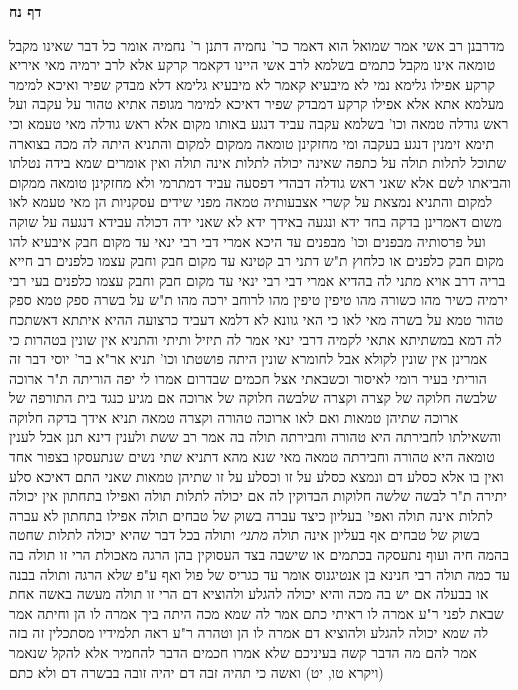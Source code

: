 \documentclass[12pt, openany]{book}
\newcommand{\sethebfont}{
\fontsize{10.5pt}{21.0pt} \selectfont
}
\newcommand{\twocol}[1]{
	{\sethebfont \begin{multicols}{2}
			#1
	\end{multicols}}	
}
\newcommand{\sectname}{}
\newcommand{\newsection}[1]{
	\addcontentsline{toc}{section}{#1}
	\renewcommand{\sectname}{#1}	
	\vspace{-\baselineskip}
	\begin{center}
		\textbf{%
\fontsize{16pt}{16pt}\selectfont
			#1}
	\end{center}
	\vspace{-\baselineskip}
	\nopagebreak
}
\begin{document}
\newsection{דף נח}
\twocol{מדרבנן 
רב אשי אמר שמואל הוא דאמר כר' נחמיה דתנן ר' נחמיה אומר כל דבר שאינו מקבל טומאה אינו מקבל כתמים 
בשלמא לרב אשי היינו דקאמר קרקע אלא לרב ירמיה מאי איריא קרקע אפילו גלימא נמי לא מיבעיא קאמר
לא מיבעיא גלימא דלא מבדק שפיר ואיכא למימר מעלמא אתא אלא אפילו קרקע דמבדק שפיר דאיכא למימר מגופה אתיא טהור
על עקבה ועל ראש גודלה טמאה וכו' בשלמא עקבה עביד דנגע באותו מקום אלא ראש גודלה מאי טעמא וכי תימא זימנין דנגע בעקבה ומי מחזקינן טומאה ממקום למקום 
והתניא היתה לה מכה בצוארה שתוכל לתלות תולה על כתפה שאינה יכולה לתלות אינה תולה
ואין אומרים שמא בידה נטלתו והביאתו לשם אלא שאני ראש גודלה דבהדי דפסעה עביד דמתרמי 
ולא מחזקינן טומאה ממקום למקום והתניא נמצאת על קשרי אצבעותיה טמאה מפני שידים עסקניות הן 
מאי טעמא לאו משום דאמרינן בדקה בחד ידא ונגעה באידך ידא לא שאני ידה דכולה עבידא דנגעה
על שוקה ועל פרסותיה מבפנים וכו' מבפנים עד היכא אמרי דבי רבי ינאי עד מקום חבק 
איבעיא להו מקום חבק כלפנים או כלחוץ ת"ש דתני רב קטינא עד מקום חבק וחבק עצמו כלפנים רב חייא בריה דרב אויא מתני לה בהדיא אמרי דבי רבי ינאי עד מקום חבק וחבק עצמו כלפנים 
בעי רבי ירמיה כשיר מהו כשורה מהו טיפין טיפין מהו לרוחב ירכה מהו 
ת"ש על בשרה ספק טמא ספק טהור טמא על בשרה מאי לאו כי האי גוונא לא דלמא דעביד כרצועה 
ההיא איתתא דאשתכח לה דמא במשתיתא אתאי לקמיה דרבי ינאי אמר לה תיזיל ותיתי 
והתניא אין שונין בטהרות כי אמרינן אין שונין לקולא אבל לחומרא שונין
היתה פושטתו וכו' תניא אר"א בר' יוסי דבר זה הוריתי בעיר רומי לאיסור וכשבאתי אצל חכמים שבדרום אמרו לי יפה הוריתה 
ת"ר ארוכה שלבשה חלוקה של קצרה וקצרה שלבשה חלוקה של ארוכה אם מגיע כנגד בית התורפה של ארוכה שתיהן טמאות ואם לאו ארוכה טהורה וקצרה טמאה 
תניא אידך בדקה חלוקה והשאילתו לחבירתה היא טהורה וחבירתה תולה בה אמר רב ששת ולענין דינא תנן אבל לענין טומאה היא טהורה וחבירתה טמאה
מאי שנא מהא דתניא שתי נשים שנתעסקו בצפור אחד ואין בו אלא כסלע דם ונמצא כסלע על זו וכסלע על זו שתיהן טמאות שאני התם דאיכא סלע יתירה 
ת"ר לבשה שלשה חלוקות הבדוקין לה אם יכולה לתלות תולה ואפילו בתחתון אין יכולה לתלות אינה תולה ואפי' בעליון 
כיצד עברה בשוק של טבחים תולה אפילו בתחתון לא עברה בשוק של טבחים אף בעליון אינה תולה
{\large\emph{מתני׳}} ותולה בכל דבר שהיא יכולה לתלות שחטה בהמה חיה ועוף נתעסקה בכתמים או שישבה בצד העסוקין בהן הרגה מאכולת הרי זו תולה בה 
עד כמה תולה רבי חנינא בן אנטיגנוס אומר עד כגריס של פול ואף ע"פ שלא הרגה ותולה בבנה או בבעלה אם יש בה מכה והיא יכולה להגלע ולהוציא דם הרי זו תולה 
מעשה באשה אחת שבאת לפני ר"ע אמרה לו ראיתי כתם אמר לה שמא מכה היתה ביך אמרה לו הן וחיתה אמר לה שמא יכולה להגלע ולהוציא דם אמרה לו הן וטהרה ר"ע 
ראה תלמידיו מסתכלין זה בזה אמר להם מה הדבר קשה בעיניכם שלא אמרו חכמים הדבר להחמיר אלא להקל שנאמר (ויקרא טו, יט) ואשה כי תהיה זבה דם יהיה זובה בבשרה דם ולא כתם 
}
\end{document}
